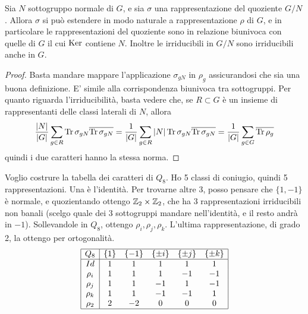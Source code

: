     \begin{myprop}
     Sia $N$ sottogruppo normale di $G$, e sia $\sigma$ una rappresentazione del quoziente $G/N$. Allora $\sigma$ si può estendere in modo naturale a rappresentazione $\rho$ di $G$, e in particolare le rappresentazioni del quoziente sono in relazione biunivoca con quelle di $G$ il cui $\operatorname{Ker}$ contiene $N$. Inoltre le irriducibili in $G/N$ sono irriducibili anche in $G$.
    \end{myprop}
    \begin{proof}
     Basta mandare mappare l'applicazione $\sigma_{gN}$ in $\rho_g$ assicurandosi che sia una buona definizione. E' simile alla corrispondenza biunivoca tra sottogruppi.
     Per quanto riguarda l'irriducibilità, basta vedere che, se $R\subset G$ è un insieme di rappresentanti delle classi laterali di $N$, allora 
     \[
      \frac{\left|N\right|}{\left|G\right|} \sum_{g\in R}\operatorname{Tr} \sigma_{gN}\overline{\operatorname{Tr} \sigma_{gN}} = \frac1{\left|G\right|} \sum_{g\in R} \left|N\right| \operatorname{Tr} \sigma_{gN}\overline{\operatorname{Tr} \sigma_{gN}} = \frac1{\left|G\right|} \sum_{g\in G} \overline{\operatorname{Tr} \rho_{g}}
     \]
     quindi i due caratteri hanno la stessa norma.
    \end{proof}
    
    \begin{myexample} 
    Voglio costrure la tabella dei caratteri di $Q_8$. Ho 5 classi di coniugio, quindi 5 rappresentazioni. Una è l'identità. Per trovarne altre 3, posso pensare che $\{1,-1\}$ è normale, e quozientando ottengo $\mathbb Z_2 \times \mathbb Z_2$, che ha 3 rappresentazioni irriducibili non banali (scelgo quale dei 3 sottogruppi mandare nell'identità, e il resto andrà in $-1$). Sollevandole in $Q_8$, ottengo $\rho_i,\rho_j,\rho_k$. L'ultima rappresentazione, di grado 2, la ottengo per ortogonalità.
     \[
      \begin{array}{|c|ccccc|}
      \hline
       Q_8    & \{1\} & \{-1\} & \{\pm i\} & \{\pm j\} & \{\pm k\} \\ \hline
       Id     &   1   &    1   &     1     &     1     &     1     \\ 
       \rho_i &   1   &    1   &     1     &    -1     &    -1     \\
       \rho_j &   1   &    1   &    -1     &     1     &    -1     \\
       \rho_k &   1   &    1   &    -1     &    -1     &     1     \\
       \rho_2 &   2   &   -2   &     0     &     0     &     0     \\ \hline
      \end{array}
     \]
     
     
    \end{myexample}


